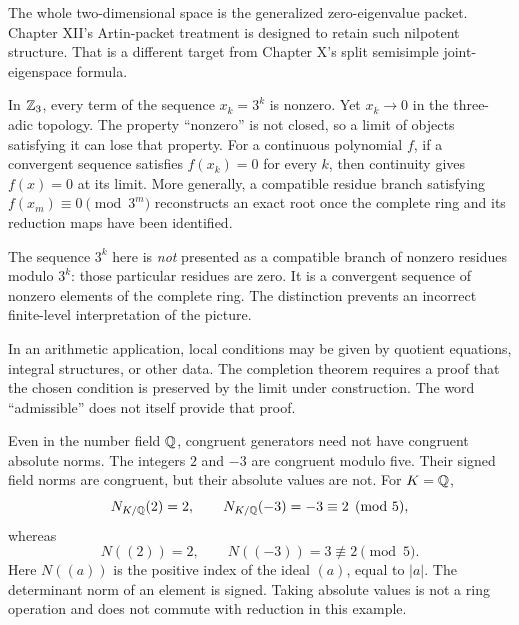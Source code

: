 The whole two-dimensional space is the generalized zero-eigenvalue packet. Chapter XII's Artin-packet treatment is designed to retain such nilpotent structure. That is a different target from Chapter X's split semisimple joint-eigenspace formula.

In $\mathbb Z_3$, every term of the sequence $x_k=3^k$ is nonzero. Yet $x_k\to0$ in the three-adic topology. The property ``nonzero'' is not closed, so a limit of objects satisfying it can lose that property.
For a continuous polynomial $f$, if a convergent sequence satisfies $f(x_k)=0$ for every $k$, then continuity gives $f(x)=0$ at its limit. More generally, a compatible residue branch satisfying $f(x_m)\equiv0\pmod{3^m}$ reconstructs an exact root once the complete ring and its reduction maps have been identified.

The sequence $3^k$ here is \emph{not} presented as a compatible branch of nonzero residues modulo $3^k$: those particular residues are zero. It is a convergent sequence of nonzero elements of the complete ring. The distinction prevents an incorrect finite-level interpretation of the picture.

In an arithmetic application, local conditions may be given by quotient equations, integral structures, or other data. The completion theorem requires a proof that the chosen condition is preserved by the limit under construction. The word ``admissible'' does not itself provide that proof.

Even in the number field $\mathbb Q$, congruent generators need not have congruent absolute norms. The integers $2$ and $-3$ are congruent modulo five. Their signed field norms are congruent, but their absolute values are not.
For $K=\mathbb Q$,
\[
N_{K/\mathbb Q}(2)=2,\qquad N_{K/\mathbb Q}(-3)=-3\equiv2\pmod5,
\]
whereas
\[
N((2))=2,\qquad N((-3))=3\not\equiv2\pmod5.
\]
Here $N((a))$ is the positive index of the ideal $(a)$, equal to $|a|$. The determinant norm of an element is signed. Taking absolute values is not a ring operation and does not commute with reduction in this example.

